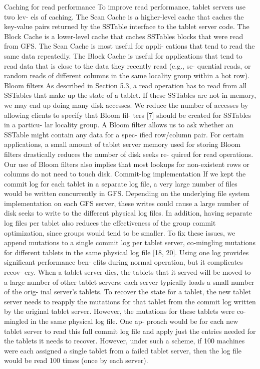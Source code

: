 \documentclass[twocolumn]{article}
\begin{document}
Caching for read performance
To improve read performance, tablet servers use two lev- els of caching. The Scan Cache is a higher-level cache that caches the key-value pairs returned by the SSTable interface to the tablet server code. The Block Cache is a lower-level cache that caches SSTables blocks that were read from GFS. The Scan Cache is most useful for appli- cations that tend to read the same data repeatedly. The Block Cache is useful for applications that tend to read data that is close to the data they recently read (e.g., se- quential reads, or random reads of different columns in the same locality group within a hot row).
Bloom filters
As described in Section 5.3, a read operation has to read from all SSTables that make up the state of a tablet. If these SSTables are not in memory, we may end up doing many disk accesses. We reduce the number of accesses by allowing clients to specify that Bloom fil- ters [7] should be created for SSTables in a particu- lar locality group. A Bloom filter allows us to ask whether an SSTable might contain any data for a spec- ified row/column pair. For certain applications, a small amount of tablet server memory used for storing Bloom filters drastically reduces the number of disk seeks re- quired for read operations. Our use of Bloom filters also implies that most lookups for non-existent rows or columns do not need to touch disk.
Commit-log implementation
If we kept the commit log for each tablet in a separate log file, a very large number of files would be written concurrently in GFS. Depending on the underlying file system implementation on each GFS server, these writes could cause a large number of disk seeks to write to the different physical log files. In addition, having separate log files per tablet also reduces the effectiveness of the group commit optimization, since groups would tend to be smaller. To fix these issues, we append mutations to a single commit log per tablet server, co-mingling mutations for different tablets in the same physical log file [18, 20].
Using one log provides significant performance ben- efits during normal operation, but it complicates recov- ery. When a tablet server dies, the tablets that it served will be moved to a large number of other tablet servers: each server typically loads a small number of the orig- inal server’s tablets. To recover the state for a tablet, the new tablet server needs to reapply the mutations for that tablet from the commit log written by the original tablet server. However, the mutations for these tablets were co-mingled in the same physical log file. One ap- proach would be for each new tablet server to read this full commit log file and apply just the entries needed for the tablets it needs to recover. However, under such a scheme, if 100 machines were each assigned a single tablet from a failed tablet server, then the log file would be read 100 times (once by each server).
\end{document}
